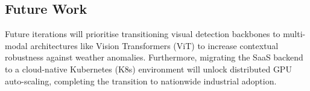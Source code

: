 \documentclass[12pt,a4paper]{article}
\begin{document}
\subsection{Future Work}
Future iterations will prioritise transitioning visual detection backbones to multi-modal architectures like Vision Transformers (ViT) to increase contextual robustness against weather anomalies. Furthermore, migrating the SaaS backend to a cloud-native Kubernetes (K8s) environment will unlock distributed GPU auto-scaling, completing the transition to nationwide industrial adoption.
\end{document}
